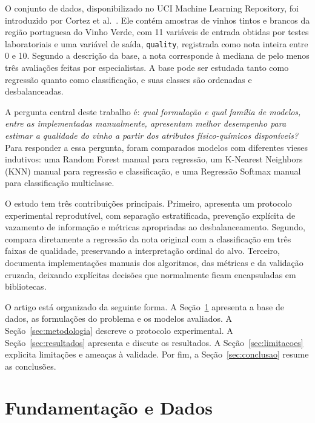 \documentclass[12pt,a4paper]{article}
\begin{document}
O conjunto de dados, disponibilizado no UCI Machine Learning Repository, foi introduzido por Cortez et al.~\cite{cortez2009modeling,uciWineQuality}. Ele cont\'em amostras de vinhos tintos e brancos da regi\~ao portuguesa do Vinho Verde, com 11 vari\'aveis de entrada obtidas por testes laboratoriais e uma vari\'avel de sa\'ida, \texttt{quality}, registrada como nota inteira entre 0 e 10. Segundo a descri\c{c}\~ao da base, a nota corresponde \`a mediana de pelo menos tr\^es avalia\c{c}\~oes feitas por especialistas. A base pode ser estudada tanto como regress\~ao quanto como classifica\c{c}\~ao, e suas classes s\~ao ordenadas e desbalanceadas.

A pergunta central deste trabalho \'e: \textit{qual formula\c{c}\~ao e qual fam\'ilia de modelos, entre as implementadas manualmente, apresentam melhor desempenho para estimar a qualidade do vinho a partir dos atributos f\'isico-qu\'imicos dispon\'iveis?} Para responder a essa pergunta, foram comparados modelos com diferentes vieses indutivos: uma Random Forest manual para regress\~ao, um K-Nearest Neighbors (KNN) manual para regress\~ao e classifica\c{c}\~ao, e uma Regress\~ao Softmax manual para classifica\c{c}\~ao multiclasse.

O estudo tem tr\^es contribui\c{c}\~oes principais. Primeiro, apresenta um protocolo experimental reprodut\'ivel, com separa\c{c}\~ao estratificada, preven\c{c}\~ao expl\'icita de vazamento de informa\c{c}\~ao e m\'etricas apropriadas ao desbalanceamento. Segundo, compara diretamente a regress\~ao da nota original com a classifica\c{c}\~ao em tr\^es faixas de qualidade, preservando a interpreta\c{c}\~ao ordinal do alvo. Terceiro, documenta implementa\c{c}\~oes manuais dos algoritmos, das m\'etricas e da valida\c{c}\~ao cruzada, deixando expl\'icitas decis\~oes que normalmente ficam encapsuladas em bibliotecas.

O artigo est\'a organizado da seguinte forma. A Se\c{c}\~ao~\ref{sec:fundamentacao} apresenta a base de dados, as formula\c{c}\~oes do problema e os modelos avaliados. A Se\c{c}\~ao~\ref{sec:metodologia} descreve o protocolo experimental. A Se\c{c}\~ao~\ref{sec:resultados} apresenta e discute os resultados. A Se\c{c}\~ao~\ref{sec:limitacoes} explicita limita\c{c}\~oes e amea\c{c}as \`a validade. Por fim, a Se\c{c}\~ao~\ref{sec:conclusao} resume as conclus\~oes.

\section{Fundamenta\c{c}\~ao e Dados}
\label{sec:fundamentacao}
\end{document}
